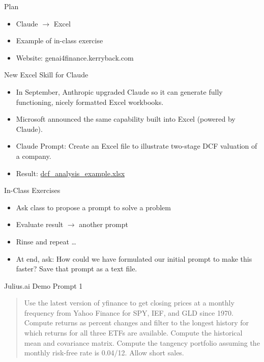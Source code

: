 \documentclass{beamer}
\begin{document}
\begin{frame}{Plan}
    \begin{itemize}
     \item Claude $\rightarrow$ Excel
     \item Example of in-class exercise 
     \item Website: genai4finance.kerryback.com
    \end{itemize}
\end{frame}

\begin{frame}{New Excel Skill for Claude}
\begin{itemize}
\item 
In September, Anthropic upgraded Claude so it can generate fully functioning, nicely formatted Excel workbooks.
\item Microsoft announced the same capability built into Excel (powered by Claude).
\item Claude Prompt: Create an Excel file to illustrate two-stage DCF valuation of a company.
\item Result: \href{https://iita2025.kerryback.com/dcf_analysis_example.xlsx}{dcf\_analysis\_example.xlsx}
\end{itemize}
\end{frame}

\begin{frame}{In-Class Exercises}
    \begin{itemize}
    \item Ask class to propose a prompt to solve a problem 
    \pause
    \item Evaluate result $\rightarrow$ another prompt
    \item Rinse and repeat \ldots
    \pause
    \item At end, ask: \alert{How could we have formulated our initial prompt to make this faster?}  Save that prompt as a text file.
    \end{itemize}
\end{frame}

\begin{frame}{Julius.ai Demo Prompt 1}
   \begin{quote}
   Use the latest version of yfinance to get closing prices at a monthly frequency from Yahoo Finance for SPY, IEF, and GLD since 1970. Compute returns as percent changes and filter to the longest history for which returns for all three ETFs are available. Compute the historical mean and covariance matrix. Compute the tangency portfolio assuming the monthly risk-free rate is 0.04/12.  Allow short sales.

   \end{quote}
\end{frame}
\end{document}
